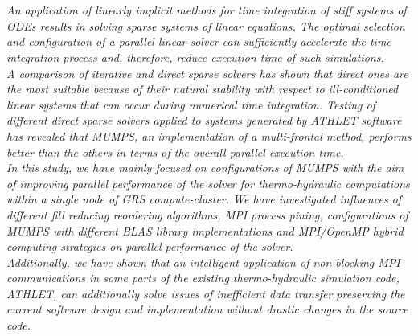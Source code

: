 \chapter{\abstractname}




\textit{An application of linearly implicit methods for time integration of stiff systems of ODEs  results in solving sparse systems of linear equations. The optimal selection and configuration of a parallel linear solver can sufficiently accelerate the time integration process and, therefore, reduce execution time of such simulations.}\\



\textit{A comparison of iterative and direct sparse solvers has shown that direct ones are the most suitable because of their natural stability with respect to ill-conditioned linear systems that can occur during numerical time integration. Testing of different direct sparse solvers applied to systems generated by ATHLET software has revealed that MUMPS, an implementation of a multi-frontal method, performs better than the others in terms of the overall parallel execution time.}\\


\textit{In this study, we have mainly focused on configurations of MUMPS with the aim of improving parallel performance of the solver for thermo-hydraulic computations within a single node of GRS compute-cluster. We have investigated influences of  different fill reducing reordering algorithms, MPI process pining, configurations of MUMPS with different BLAS library implementations and MPI/OpenMP hybrid computing strategies on parallel performance of the solver.}\\


\textit{Additionally, we have shown that an intelligent application of non-blocking MPI communications in some parts of the existing thermo-hydraulic simulation code, ATHLET, can additionally solve issues of inefficient data transfer preserving the current software design and implementation without drastic changes in the source code.}\\

